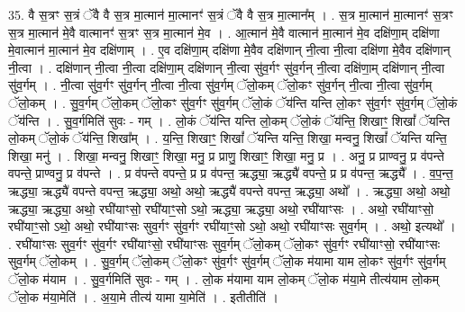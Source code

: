 \documentclass[17pt]{extarticle}
\begin{document}
35. वै स॒त्रꣳ स॒त्रं ॅवै वै स॒त्र मा॒त्मान॑ मा॒त्मानꣳ॑ स॒त्रं ॅवै वै स॒त्र मा॒त्मान᳚म् । . स॒त्र मा॒त्मान॑ मा॒त्मानꣳ॑ स॒त्रꣳ स॒त्र मा॒त्मान॑ मे॒वै वात्मानꣳ॑ स॒त्रꣳ स॒त्र मा॒त्मान॑ मे॒व । . आ॒त्मान॑ मे॒वै वात्मान॑ मा॒त्मान॑ मे॒व दक्षि॑णा॒म् दक्षि॑णा मे॒वात्मान॑ मा॒त्मान॑ मे॒व दक्षि॑णाम् । . ए॒व दक्षि॑णा॒म् दक्षि॑णा मे॒वैव दक्षि॑णान् नी॒त्वा नी॒त्वा दक्षि॑णा मे॒वैव दक्षि॑णान् नी॒त्वा । . दक्षि॑णान् नी॒त्वा नी॒त्वा दक्षि॑णा॒म् दक्षि॑णान् नी॒त्वा सु॑व॒र्गꣳ सु॑व॒र्गन् नी॒त्वा दक्षि॑णा॒म् दक्षि॑णान् नी॒त्वा सु॑व॒र्गम् । . नी॒त्वा सु॑व॒र्गꣳ सु॑व॒र्गन् नी॒त्वा नी॒त्वा सु॑व॒र्गम् ॅलो॒कम् ॅलो॒कꣳ सु॑व॒र्गन् नी॒त्वा नी॒त्वा सु॑व॒र्गम् ॅलो॒कम् । . सु॒व॒र्गम् ॅलो॒कम् ॅलो॒कꣳ सु॑व॒र्गꣳ सु॑व॒र्गम् ॅलो॒कं ॅय॑न्ति यन्ति लो॒कꣳ सु॑व॒र्गꣳ सु॑व॒र्गम् ॅलो॒कं ॅय॑न्ति । . सु॒व॒र्गमिति॑ सुवः - गम् । . लो॒कं ॅय॑न्ति यन्ति लो॒कम् ॅलो॒कं ॅय॑न्ति॒ शिखाꣳ॒॒ शिखां᳚ ॅयन्ति लो॒कम् ॅलो॒कं ॅय॑न्ति॒ शिखा᳚म् । . य॒न्ति॒ शिखाꣳ॒॒ शिखां᳚ ॅयन्ति यन्ति॒ शिखा॒ मन्वनु॒ शिखां᳚ ॅयन्ति यन्ति॒ शिखा॒ मनु॑ । . शिखा॒ मन्वनु॒ शिखाꣳ॒॒ शिखा॒ मनु॒ प्र प्राणु॒ शिखाꣳ॒॒ शिखा॒ मनु॒ प्र । . अनु॒ प्र प्राण्वनु॒ प्र व॑पन्ते वपन्ते॒ प्राण्वनु॒ प्र व॑पन्ते । . प्र व॑पन्ते वपन्ते॒ प्र प्र व॑पन्त॒ ऋद्ध्या॒ ऋद्ध्यै॑ वपन्ते॒ प्र प्र व॑पन्त॒ ऋद्ध्यै᳚ । . व॒प॒न्त॒ ऋद्ध्या॒ ऋद्ध्यै॑ वपन्ते वपन्त॒ ऋद्ध्या॒ अथो॒ अथो॒ ऋद्ध्यै॑ वपन्ते वपन्त॒ ऋद्ध्या॒ अथो᳚ । . ऋद्ध्या॒ अथो॒ अथो॒ ऋद्ध्या॒ ऋद्ध्या॒ अथो॒ रघी॑याꣳसो॒ रघी॑याꣳ॒॒सो ऽथो॒ ऋद्ध्या॒ ऋद्ध्या॒ अथो॒ रघी॑याꣳसः । . अथो॒ रघी॑याꣳसो॒ रघी॑याꣳ॒॒सो ऽथो॒ अथो॒ रघी॑याꣳसः सुव॒र्गꣳ सु॑व॒र्गꣳ रघी॑याꣳ॒॒सो ऽथो॒ अथो॒ रघी॑याꣳसः सुव॒र्गम् । . अथो॒ इत्यथो᳚ । . रघी॑याꣳसः सुव॒र्गꣳ सु॑व॒र्गꣳ रघी॑याꣳसो॒ रघी॑याꣳसः सुव॒र्गम् ॅलो॒कम् ॅलो॒कꣳ सु॑व॒र्गꣳ रघी॑याꣳसो॒ रघी॑याꣳसः सुव॒र्गम् ॅलो॒कम् । . सु॒व॒र्गम् ॅलो॒कम् ॅलो॒कꣳ सु॑व॒र्गꣳ सु॑व॒र्गम् ॅलो॒क म॑यामा याम लो॒कꣳ सु॑व॒र्गꣳ सु॑व॒र्गम् ॅलो॒क म॑याम । . सु॒व॒र्गमिति॑ सुवः - गम् । . लो॒क म॑यामा याम लो॒कम् ॅलो॒क म॑या॒मे तीत्य॑याम लो॒कम् ॅलो॒क म॑या॒मेति॑ । . अ॒या॒मे तीत्य॑ यामा या॒मेति॑ । . इतीतीति॑ । \newline
\pagebreak
{}
\end{document}
